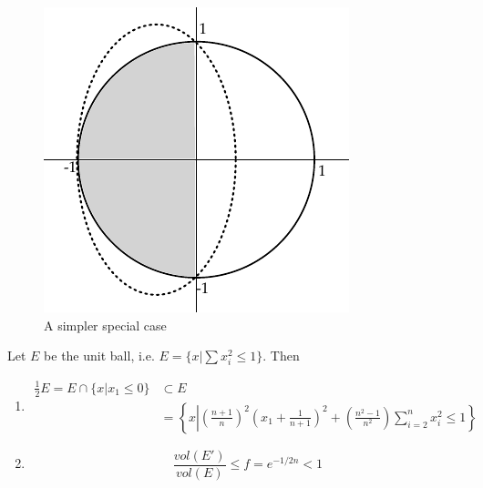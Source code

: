 \begin{figure}[hbt]
\begin{center}
\includegraphics{./images/ellipsoidStart}
\end{center}
\caption{A simpler special case}
\label{Fig:ellipsoidStart}
\end{figure}

\begin{lem} Let $E$ be the unit ball, i.e. $E=\{x|\sum x_i^2\leq 1\}$. Then

\begin{enumerate}
\item 
\begin{align*}
\frac{1}{2}E=E\cap \{x|x_1\leq 0\} &\subset E\\
	&= \left\{x\left|\left(\frac{n+1}{n}\right)^2\left(x_1+\frac{1}{n+1}\right)^2+\left(\frac{n^2-1}{n^2}\right) \sum_{i=2}^n x_i^2 \leq 1\right.\right\}
\end{align*}
\item \[\frac{vol(E')}{vol(E)}\leq f = e^{-1/2n}<1\]
\end{enumerate}
\end{lem}

